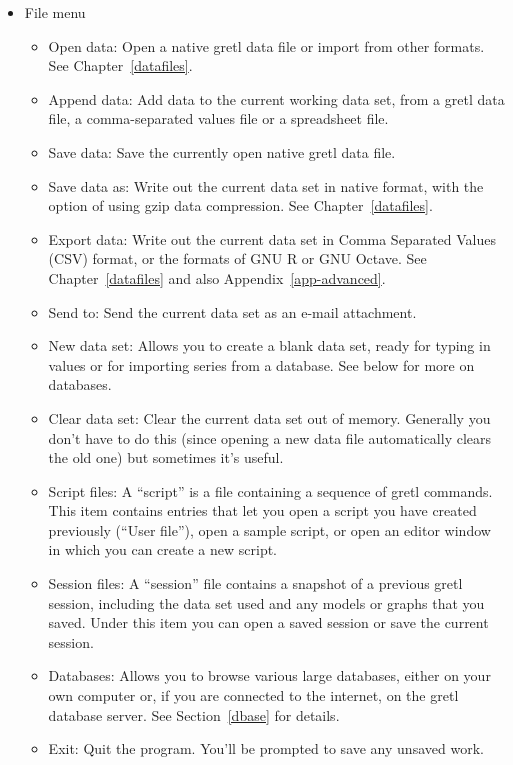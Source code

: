 \begin{itemize}
\item \textsf{File menu}
  \begin{itemize}
  \item \textsf{Open data}: Open a native gretl data file or
    import from other formats.  See Chapter~\ref{datafiles}.
  \item \textsf{Append data}: Add data to the current working data
    set, from a gretl data file, a comma-separated values file
    or a spreadsheet file.
  \item \textsf{Save data}: Save the currently open native gretl
    data file.
  \item \textsf{Save data as}: Write out the current data set in
    native format, with the option of using gzip data compression. See
    Chapter~\ref{datafiles}.
  \item \textsf{Export data}: Write out the current data set in Comma
    Separated Values (CSV) format, or the formats of GNU R or GNU
    Octave. See Chapter~\ref{datafiles} and also
    Appendix~\ref{app-advanced}.
  \item \textsf{Send to}: Send the current data set as an e-mail
    attachment.
  \item \textsf{New data set}: Allows you to create a blank data set,
    ready for typing in values or for importing series from a
    database.  See below for more on databases.
  \item \textsf{Clear data set}: Clear the current data set out of
    memory.  Generally you don't have to do this (since opening a new
    data file automatically clears the old one) but sometimes it's
    useful.
  \item \textsf{Script files}: A ``script'' is a file containing a
    sequence of gretl commands.  This item contains entries
    that let you open a script you have created previously (``User
    file''), open a sample script, or open an editor window in which
    you can create a new script.
  \item \textsf{Session files}: A ``session'' file contains a snapshot
    of a previous gretl session, including the data set used
    and any models or graphs that you saved.  Under this item you
    can open a saved session or save the current session.
  \item \textsf{Databases}: Allows you to browse various large
    databases, either on your own computer or, if you are connected
    to the internet, on the gretl database server.  See
    Section~\ref{dbase} for details.
  \item \textsf{Exit}: Quit the program.  You'll be prompted to save
    any unsaved work.
  \end{itemize}


\end{itemize}
